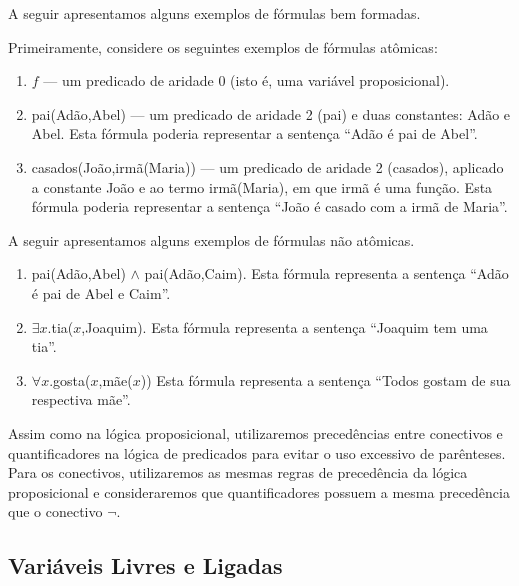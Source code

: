A seguir apresentamos alguns exemplos de fórmulas bem formadas.
\begin{Example}
Primeiramente, considere os seguintes exemplos de fórmulas atômicas:
\begin{enumerate}
  \item $f$ --- um predicado de aridade 0 (isto é, uma variável
    proposicional).
  \item pai(Adão,Abel) --- um predicado de aridade 2 (pai) e duas
    constantes: Adão e Abel. Esta fórmula poderia representar a
    sentença ``Adão é pai de Abel''.
  \item casados(João,irmã(Maria)) --- um predicado de aridade 2
    (casados), aplicado a constante João e ao termo irmã(Maria), em
    que irmã é uma função. Esta fórmula poderia representar a sentença
    ``João é casado com a irmã de Maria''.
\end{enumerate}
A seguir apresentamos alguns exemplos de fórmulas não atômicas.
\begin{enumerate}
  \item pai(Adão,Abel) $\land$ pai(Adão,Caim). Esta fórmula representa
    a sentença ``Adão é pai de Abel e Caim''.
  \item $\exists x. $tia($x$,Joaquim). Esta fórmula representa a
    sentença ``Joaquim tem uma tia''.
  \item $\forall x. $gosta($x$,mãe($x$)) Esta fórmula representa a
    sentença ``Todos gostam de sua respectiva mãe''.
\end{enumerate}
\end{Example}

Assim como na lógica proposicional, utilizaremos precedências entre
conectivos e quantificadores na lógica de predicados para evitar
o uso excessivo de parênteses. Para os conectivos, utilizaremos as
mesmas regras de precedência da lógica proposicional e consideraremos
que quantificadores possuem a mesma precedência que o conectivo
$\neg$.

\subsection{Variáveis Livres e Ligadas}

